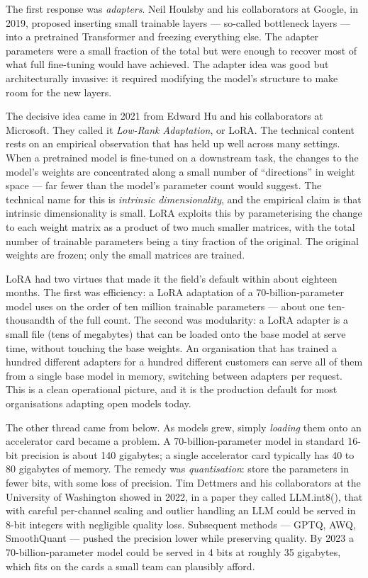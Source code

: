 The first response was \emph{adapters}. Neil Houlsby and his
collaborators at Google, in 2019, proposed inserting small
trainable layers --- so-called bottleneck layers --- into a
pretrained Transformer and freezing everything else. The
adapter parameters were a small fraction of the total but were
enough to recover most of what full fine-tuning would have
achieved. The adapter idea was good but architecturally
invasive: it required modifying the model's structure to make
room for the new layers.

The decisive idea came in 2021 from Edward Hu and his
collaborators at Microsoft. They called it \emph{Low-Rank
Adaptation}, or LoRA. The technical content rests on an
empirical observation that has held up well across many
settings. When a pretrained model is fine-tuned on a downstream
task, the changes to the model's weights are concentrated along
a small number of ``directions'' in weight space --- far fewer
than the model's parameter count would suggest. The technical
name for this is \emph{intrinsic dimensionality}, and the
empirical claim is that intrinsic dimensionality is small. LoRA
exploits this by parameterising the change to each weight
matrix as a product of two much smaller matrices, with the
total number of trainable parameters being a tiny fraction of
the original. The original weights are frozen; only the small
matrices are trained.

LoRA had two virtues that made it the field's default within
about eighteen months. The first was efficiency: a LoRA
adaptation of a 70-billion-parameter model uses on the order of
ten million trainable parameters --- about one ten-thousandth
of the full count. The second was modularity: a LoRA adapter
is a small file (tens of megabytes) that can be loaded onto
the base model at serve time, without touching the base
weights. An organisation that has trained a hundred different
adapters for a hundred different customers can serve all of
them from a single base model in memory, switching between
adapters per request. This is a clean operational picture, and
it is the production default for most organisations adapting
open models today.

The other thread came from below. As models grew, simply
\emph{loading} them onto an accelerator card became a problem.
A 70-billion-parameter model in standard 16-bit precision is
about 140 gigabytes; a single accelerator card typically has
40 to 80 gigabytes of memory. The remedy was \emph{quantisation}:
store the parameters in fewer bits, with some loss of precision.
Tim Dettmers and his collaborators at the University of
Washington showed in 2022, in a paper they called LLM.int8(),
that with careful per-channel scaling and outlier handling an
LLM could be served in 8-bit integers with negligible quality
loss. Subsequent methods --- GPTQ, AWQ, SmoothQuant --- pushed
the precision lower while preserving quality. By 2023 a
70-billion-parameter model could be served in 4 bits at
roughly 35 gigabytes, which fits on the cards a small team can
plausibly afford.

